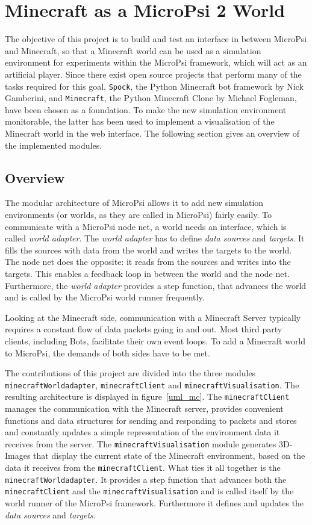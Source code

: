\chapter{Minecraft as a MicroPsi 2 World}
The objective of this project is to build and test an interface in between MicroPsi and Minecraft, so that a Minecraft world can be used as a simulation environment for experiments within the MicroPsi framework, which will act as an artificial player. Since there exist open source projects that perform many of the tasks required for this goal, \texttt{Spock}, the Python Minecraft bot framework by Nick Gamberini, and \texttt{Minecraft}, the Python Minecraft Clone by Michael Fogleman, have been chosen as a foundation. To make the new simulation environment monitorable, the latter has been used to implement a visualisation of the Minecraft world in the web interface. The following section gives an overview of the implemented modules.

\section{Overview}
The modular architecture of MicroPsi allows it to add new simulation environments (or worlds, as they are called in MicroPsi) fairly easily. To communicate with a MicroPsi node net, a world needs an interface, which is called \emph{world adapter}. The \emph{world adapter} has to define \emph{data sources} and \emph{targets}. It fills the sources with data from the world and writes the targets to the world. The node net does the opposite: it reads from the sources and writes into the targets. This enables a feedback loop in between the world and the node net. Furthermore, the \emph{world adapter} provides a step function, that advances the world and is called by the MicroPsi world runner frequently.

Looking at the Minecraft side, communication with a Minecraft Server typically requires a constant flow of data packets going in and out. Most third party clients, including Bots, facilitate their own event loops. To add a Minecraft world to MicroPsi, the demands of both sides have to be met.

The contributions of this project are divided into the three modules \texttt{minecraftWorldadapter}, \texttt{minecraftClient} and \texttt{minecraftVisualisation}. The resulting architecture is displayed in figure~\ref{uml_mc}. The \texttt{minecraftClient} manages the communication with the Minecraft server, provides convenient functions and data structures for sending and responding to packets and stores and constantly updates a simple representation of the environment data it receives from the server. The \texttt{minecraftVisualisation} module generates 3D-Images that display the current state of the Minecraft environment, based on the data it receives from the \texttt{minecraftClient}. What ties it all together is the \texttt{minecraftWorldadapter}. It provides a step function that advances both the \texttt{minecraftClient} and the \texttt{minecraftVisualisation} and is called itself by the world runner of the MicroPsi framework. Furthermore it defines and updates the \emph{data sources} and \emph{targets}.

